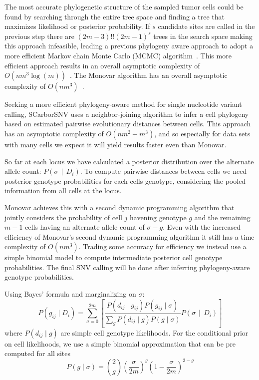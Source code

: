 \documentclass[../../main.tex]{subfiles}
\begin{document}
The most accurate phylogenetic structure of the sampled tumor cells could be found by searching through the entire tree space and finding a tree that maximizes likelihood or posterior probability.
If $s$ candidate sites are called in the previous step there are $(2m-3)!!(2m-1)^s$ trees in the search space making this approach infeasible, leading a previous phylogeny aware approach to adopt a more efficient Markov chain Monte Carlo (MCMC) algorithm~\cite{sciphi}.
This more efficient approach results in an overall asymptotic complexity of $O(nm^3\log(m))$~\cite{sciphi}.
The Monovar algorithm has an overall asymptotic complexity of $O(nm^3)$~\cite{monovar}.

Seeking a more efficient phylogeny-aware method for single nucleotide variant calling, SCarborSNV uses a neighbor-joining algorithm to infer a cell phylogeny based on estimated pairwise evolutionary distances between cells.
This approach has an asymptotic complexity of $O(nm^2+m^3)$, and so especially for data sets with many cells we expect it will yield results faster even than Monovar.

So far at each locus we have calculated a posterior distribution over the alternate allele count: $P(\sigma\,\mid\,D_i)$.
To compute pairwise distances between cells we need posterior genotype probabilities for each cells genotype, considering the pooled information from all cells at the locus.

Monovar achieves this with a second dynamic programming algorithm that jointly considers the probability of cell $j$ havening genotype $g$ and the remaining $m-1$ cells having an alternate allele count of $\sigma - g$.
Even with the increased efficiency of Monovar's second dynamic programming algorithm it still has a time complexity of $O(nm^3)$.
Trading some accuracy for efficiency we instead use a simple binomial model to compute intermediate posterior cell genotype probabilities. 
The final SNV calling will be done after inferring phylogeny-aware genotype probabilities.

Using Bayes' formula and marginalizing on $\sigma$:
\begin{equation}\label{eq:posteriorgenotypes}
P(g_{ij}\mid D_i) = \sum_{\sigma=0}^{2m}  \left[ \frac{P(d_{ij}\mid g_{ij})P(g_{ij}\mid \sigma)}{\sum_g P(d_{ij}\mid g)P(g \mid \sigma)}  P(\sigma\,\mid\,D_i)\right]
\end{equation}
where $P(d_{ij}\mid g)$ are simple cell genotype likelihoods.
For the conditional prior on cell likelihoods, we use a simple binomial approximation that can be pre computed for all sites
\begin{equation*}
P(g\mid \sigma) = \binom{2}{g} \left(\frac{\sigma}{2m}\right)^g \left(1-\frac{\sigma}{2m}\right)^{2-g}
\end{equation*}
\end{document}
